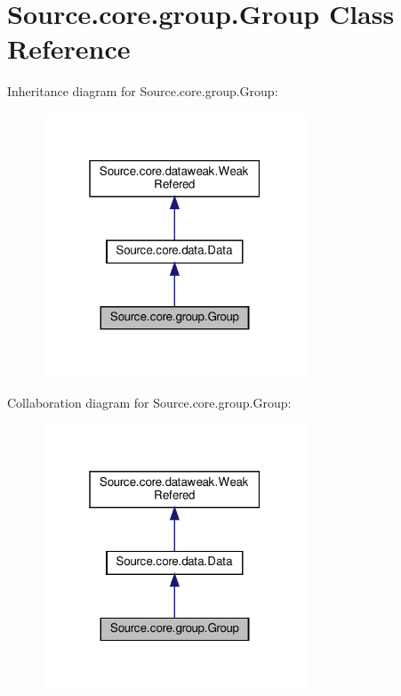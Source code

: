 \hypertarget{classSource_1_1core_1_1group_1_1Group}{}\section{Source.\+core.\+group.\+Group Class Reference}
\label{classSource_1_1core_1_1group_1_1Group}


Inheritance diagram for Source.\+core.\+group.\+Group\+:\nopagebreak
\begin{figure}[H]
\begin{center}
\leavevmode
\includegraphics[width=223pt]{classSource_1_1core_1_1group_1_1Group__inherit__graph}
\end{center}
\end{figure}


Collaboration diagram for Source.\+core.\+group.\+Group\+:\nopagebreak
\begin{figure}[H]
\begin{center}
\leavevmode
\includegraphics[width=223pt]{classSource_1_1core_1_1group_1_1Group__coll__graph}
\end{center}
\end{figure}
